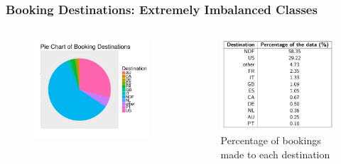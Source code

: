 \documentclass{beamer}
\begin{document}

\begin{frame}
\frametitle{Booking Destinations: Extremely Imbalanced Classes}
\begin{columns}
  \begin{column}{0.45\textwidth}
      \begin{figure}
        \includegraphics[width = 1.0\textwidth]{pie_chart_dest.pdf} 
      \end{figure}
  \end{column}
  \begin{column}{0.55\textwidth}
      \begin{figure}
        \includegraphics[width = 1.0\textwidth]{dest_table.png} 
        \caption{Percentage of bookings made to each destination}
      \end{figure}
  \end{column}
  \end{columns}
\end{frame}
\end{document}
